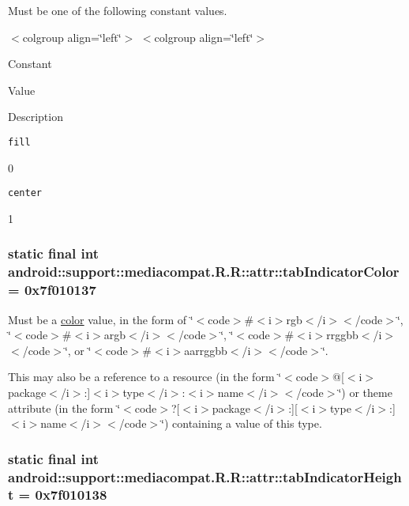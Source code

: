 Must be one of the following constant values. \begin{TabularC}{0}
\hline
\end{TabularC}
$<$colgroup align=\char`\"{}left\char`\"{}$>$ $<$colgroup align=\char`\"{}left\char`\"{}$>$ 

Constant

Value

Description 

{\tt fill}

0

{\tt center}

1\hypertarget{classandroid_1_1support_1_1mediacompat_1_1_r_1_1attr_a792a79bfdc82fc2d2cd6adc785f2289}{
\subsubsection[{tabIndicatorColor}]{\setlength{\rightskip}{0pt plus 5cm}static final int android::support::mediacompat.R.R::attr::tabIndicatorColor = 0x7f010137}}
\label{classandroid_1_1support_1_1mediacompat_1_1_r_1_1attr_a792a79bfdc82fc2d2cd6adc785f2289}


Must be a \hyperlink{classandroid_1_1support_1_1mediacompat_1_1_r_1_1color}{color} value, in the form of \char`\"{}$<$code$>$\#$<$i$>$rgb$<$/i$>$$<$/code$>$\char`\"{}, \char`\"{}$<$code$>$\#$<$i$>$argb$<$/i$>$$<$/code$>$\char`\"{}, \char`\"{}$<$code$>$\#$<$i$>$rrggbb$<$/i$>$$<$/code$>$\char`\"{}, or \char`\"{}$<$code$>$\#$<$i$>$aarrggbb$<$/i$>$$<$/code$>$\char`\"{}. 

This may also be a reference to a resource (in the form \char`\"{}$<$code$>$@\mbox{[}$<$i$>$package$<$/i$>$:\mbox{]}$<$i$>$type$<$/i$>$:$<$i$>$name$<$/i$>$$<$/code$>$\char`\"{}) or theme attribute (in the form \char`\"{}$<$code$>$?\mbox{[}$<$i$>$package$<$/i$>$:\mbox{]}\mbox{[}$<$i$>$type$<$/i$>$:\mbox{]}$<$i$>$name$<$/i$>$$<$/code$>$\char`\"{}) containing a value of this type. \hypertarget{classandroid_1_1support_1_1mediacompat_1_1_r_1_1attr_9cd0c1ee21a19897015c03e431169ccf}{
\subsubsection[{tabIndicatorHeight}]{\setlength{\rightskip}{0pt plus 5cm}static final int android::support::mediacompat.R.R::attr::tabIndicatorHeight = 0x7f010138}}
\label{classandroid_1_1support_1_1mediacompat_1_1_r_1_1attr_9cd0c1ee21a19897015c03e431169ccf}


